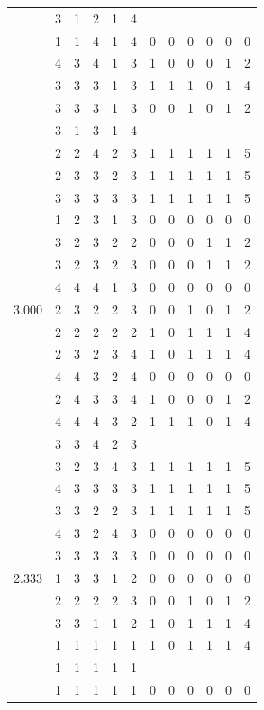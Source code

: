 \documentclass[]{msu-thesis}
\theoremstyle{definition}
\theoremstyle{definition}
\theoremstyle{definition}
\theoremstyle{remark}
\begin{document}
\begin{table}
{\begin{tabular}[t]{rrrrrrrrrrrr}
 & 3 & 1 & 2 & 1 & 4 &  &  &  &  &  & \\
 & 1 & 1 & 4 & 1 & 4 & 0 & 0 & 0 & 0 & 0 & 0\\
 & 4 & 3 & 4 & 1 & 3 & 1 & 0 & 0 & 0 & 1 & 2\\
 & 3 & 3 & 3 & 1 & 3 & 1 & 1 & 1 & 0 & 1 & 4\\
 & 3 & 3 & 3 & 1 & 3 & 0 & 0 & 1 & 0 & 1 & 2\\
 & 3 & 1 & 3 & 1 & 4 &  &  &  &  &  & \\
 & 2 & 2 & 4 & 2 & 3 & 1 & 1 & 1 & 1 & 1 & 5\\
 & 2 & 3 & 3 & 2 & 3 & 1 & 1 & 1 & 1 & 1 & 5\\
 & 3 & 3 & 3 & 3 & 3 & 1 & 1 & 1 & 1 & 1 & 5\\
 & 1 & 2 & 3 & 1 & 3 & 0 & 0 & 0 & 0 & 0 & 0\\
 & 3 & 2 & 3 & 2 & 2 & 0 & 0 & 0 & 1 & 1 & 2\\
 & 3 & 2 & 3 & 2 & 3 & 0 & 0 & 0 & 1 & 1 & 2\\
 & 4 & 4 & 4 & 1 & 3 & 0 & 0 & 0 & 0 & 0 & 0\\
3.000 & 2 & 3 & 2 & 2 & 3 & 0 & 0 & 1 & 0 & 1 & 2\\
 & 2 & 2 & 2 & 2 & 2 & 1 & 0 & 1 & 1 & 1 & 4\\
 & 2 & 3 & 2 & 3 & 4 & 1 & 0 & 1 & 1 & 1 & 4\\
 & 4 & 4 & 3 & 2 & 4 & 0 & 0 & 0 & 0 & 0 & 0\\
 & 2 & 4 & 3 & 3 & 4 & 1 & 0 & 0 & 0 & 1 & 2\\
 & 4 & 4 & 4 & 3 & 2 & 1 & 1 & 1 & 0 & 1 & 4\\
 & 3 & 3 & 4 & 2 & 3 &  &  &  &  &  & \\
 & 3 & 2 & 3 & 4 & 3 & 1 & 1 & 1 & 1 & 1 & 5\\
 & 4 & 3 & 3 & 3 & 3 & 1 & 1 & 1 & 1 & 1 & 5\\
 & 3 & 3 & 2 & 2 & 3 & 1 & 1 & 1 & 1 & 1 & 5\\
 & 4 & 3 & 2 & 4 & 3 & 0 & 0 & 0 & 0 & 0 & 0\\
 & 3 & 3 & 3 & 3 & 3 & 0 & 0 & 0 & 0 & 0 & 0\\
2.333 & 1 & 3 & 3 & 1 & 2 & 0 & 0 & 0 & 0 & 0 & 0\\
 & 2 & 2 & 2 & 2 & 3 & 0 & 0 & 1 & 0 & 1 & 2\\
 & 3 & 3 & 1 & 1 & 2 & 1 & 0 & 1 & 1 & 1 & 4\\
 & 1 & 1 & 1 & 1 & 1 & 1 & 0 & 1 & 1 & 1 & 4\\
 & 1 & 1 & 1 & 1 & 1 &  &  &  &  &  & \\
 & 1 & 1 & 1 & 1 & 1 & 0 & 0 & 0 & 0 & 0 & 0\\

\end{tabular}}
\end{table}
\end{document}

